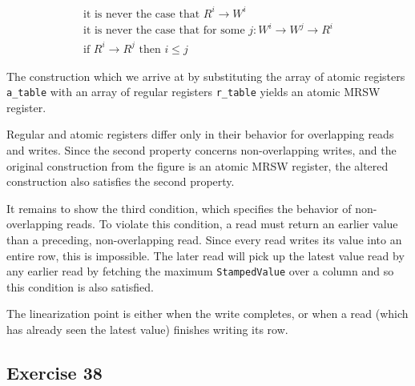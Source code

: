 \documentclass[a4paper,10pt]{article}
\begin{document}
\begin{gather}
\text{it is never the case that } R^i \rightarrow W^i \\
\text{it is never the case that for some } j: W^i \rightarrow W^j \rightarrow R^i \\
\text{if } R^i \rightarrow R^j \text{ then } i \leq j
\end{gather}

The construction which we arrive at by substituting the array of atomic
registers \lstinline|a_table| with an array of regular registers
\lstinline|r_table| yields an atomic MRSW register.

Regular and atomic registers differ only in their behavior for overlapping reads
and writes. Since the second property concerns non-overlapping writes, and the original
construction from the figure is an atomic MRSW register, the altered construction
also satisfies the second property.

It remains to show the third condition, which specifies the behavior of non-overlapping
reads. To violate this condition, a read must return an earlier value than a preceding,
non-overlapping read. Since every read writes its value into an entire row, this is impossible.
The later read will pick up the latest value read by any earlier read by fetching
the maximum \lstinline|StampedValue| over a column and so this condition is also satisfied.

The linearization point is either when the write completes, or when a read (which has 
already seen the latest value) finishes writing its row.

\begin{comment}
The construction which we arrive at by substituting the array of atomic registers 
\lstinline|a_table| with an array of regular registers \lstinline|r_table| does not
yield an atomic MRSW register.

We only need to show that the third condition is not satisfied; \lstinline|read()|
determines some value from \lstinline|r_table|, which is returned as the result.
However, since the value is taken from a regular register (which does not necessarily
satisify the third condition), this value is also not guaranteed to satisfy it.
\end{comment}


\subsection{Exercise 38}
\end{document}
